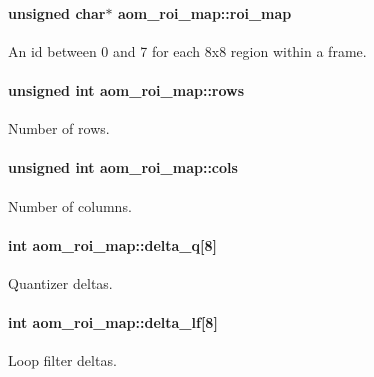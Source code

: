 \paragraph[{\texorpdfstring{roi\+\_\+map}{roi_map}}]{\setlength{\rightskip}{0pt plus 5cm}unsigned char$\ast$ aom\+\_\+roi\+\_\+map\+::roi\+\_\+map}\hypertarget{structaom__roi__map_a7d12a1d1074e33fd32077d568e4304d6}{}\label{structaom__roi__map_a7d12a1d1074e33fd32077d568e4304d6}
An id between 0 and 7 for each 8x8 region within a frame. 
\paragraph[{\texorpdfstring{rows}{rows}}]{\setlength{\rightskip}{0pt plus 5cm}unsigned int aom\+\_\+roi\+\_\+map\+::rows}\hypertarget{structaom__roi__map_a70a76ce19292cbdf943a5658b9601fdd}{}\label{structaom__roi__map_a70a76ce19292cbdf943a5658b9601fdd}
Number of rows. 
\paragraph[{\texorpdfstring{cols}{cols}}]{\setlength{\rightskip}{0pt plus 5cm}unsigned int aom\+\_\+roi\+\_\+map\+::cols}\hypertarget{structaom__roi__map_a33d4739da69f1885bf7572b99cc9b367}{}\label{structaom__roi__map_a33d4739da69f1885bf7572b99cc9b367}
Number of columns. 
\paragraph[{\texorpdfstring{delta\+\_\+q}{delta_q}}]{\setlength{\rightskip}{0pt plus 5cm}int aom\+\_\+roi\+\_\+map\+::delta\+\_\+q\mbox{[}8\mbox{]}}\hypertarget{structaom__roi__map_a85c39484ec01f907a1d50aa969d38ee2}{}\label{structaom__roi__map_a85c39484ec01f907a1d50aa969d38ee2}
Quantizer deltas. 
\paragraph[{\texorpdfstring{delta\+\_\+lf}{delta_lf}}]{\setlength{\rightskip}{0pt plus 5cm}int aom\+\_\+roi\+\_\+map\+::delta\+\_\+lf\mbox{[}8\mbox{]}}\hypertarget{structaom__roi__map_a3a37c73fcdcfac9f6f7fec338e746982}{}\label{structaom__roi__map_a3a37c73fcdcfac9f6f7fec338e746982}
Loop filter deltas. 
